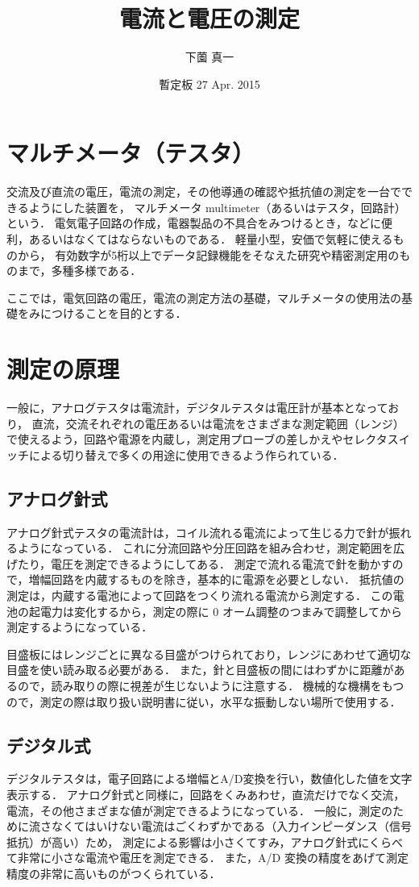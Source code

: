 \documentclass[11pt,sort]{jarticle}
\title{電流と電圧の測定}
\author{下薗 真一}
\date{暫定板 27 Apr. 2015}
\begin{document}
\maketitle

\section{マルチメータ（テスタ）}

交流及び直流の電圧，電流の測定，その他導通の確認や抵抗値の測定を一台でできるようにした装置を，
マルチメータ multimeter（あるいはテスタ，回路計）という．
電気電子回路の作成，電器製品の不具合をみつけるとき，などに便利，あるいはなくてはならないものである．
軽量小型，安価で気軽に使えるものから，
有効数字が5桁以上でデータ記録機能をそなえた研究や精密測定用のものまで，多種多様である．

ここでは，電気回路の電圧，電流の測定方法の基礎，マルチメータの使用法の基礎をみにつけることを目的とする．

\section{測定の原理}
一般に，アナログテスタは電流計，デジタルテスタは電圧計が基本となっており，
直流，交流それぞれの電圧あるいは電流をさまざまな測定範囲（レンジ）で使えるよう，回路や電源を内蔵し，測定用プローブの差しかえやセレクタスイッチによる切り替えで多くの用途に使用できるよう作られている．

\subsection{アナログ針式}
アナログ針式テスタの電流計は，コイル流れる電流によって生じる力で針が振れるようになっている．
これに分流回路や分圧回路を組み合わせ，測定範囲を広げたり，電圧を測定できるようにしてある．
測定で流れる電流で針を動かすので，増幅回路を内蔵するものを除き，基本的に電源を必要としない．
抵抗値の測定は，内蔵する電池によって回路をつくり流れる電流から測定する．
この電池の起電力は変化するから，測定の際に 0 オーム調整のつまみで調整してから測定するようになっている．

目盛板にはレンジごとに異なる目盛がつけられており，レンジにあわせて適切な目盛を使い読み取る必要がある．
また，針と目盛板の間にはわずかに距離があるので，読み取りの際に視差が生じないように注意する．
機械的な機構をもつので，測定の際は取り扱い説明書に従い，水平な振動しない場所で使用する．

\subsection{デジタル式}
デジタルテスタは，電子回路による増幅とA/D変換を行い，数値化した値を文字表示する．
アナログ針式と同様に，回路をくみあわせ，直流だけでなく交流，電流，その他さまざまな値が測定できるようになっている．
一般に，測定のために流さなくてはいけない電流はごくわずかである（入力インピーダンス（信号抵抗）が高い）ため，
測定による影響は小さくてすみ，アナログ針式にくらべて非常に小さな電流や電圧を測定できる．
また，A/D 変換の精度をあげて測定精度の非常に高いものがつくられている．
\end{document}
